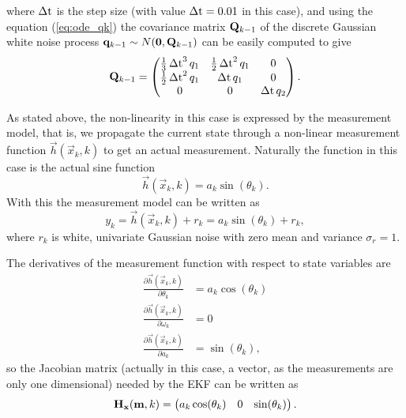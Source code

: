%
where $\operatorname{\Delta t}$ is the step size (with value $\operatorname{\Delta t} = 0.01$ in this case),
and using the equation (\ref{eq:ode_qk}) the covariance matrix
$\mathbf{Q}_{k-1}$ of the discrete Gaussian white noise process
$\mathbf{q}_{k-1} \sim N(\mathbf{0},\mathbf{Q}_{k-1})$ can be easily computed
to give
%
\begin{equation}
%
\mat{Q}_{k-1} = \begin{pmatrix} \frac{1}{3}\dt^3q_1 &
\frac{1}{2}\dt^2q_1 & 0\\ \frac{1}{2}\dt^2q_1 & \dt q_1 & 0\\ 0 & 0 &
\dt q_2
\end{pmatrix}.
\end{equation}
%

As stated above, the non-linearity in this case is expressed by the
measurement model, that is, we propagate the current state through a
non-linear measurement function $\vec{h}(\vec{x}_{k},k)$ to get an
actual measurement. Naturally the function in this case is the actual
sine function
%
\begin{equation}
%
\vec{h}(\vec{x}_{k},k) = a_k\sin(\theta_k). \label{eq:ekf_demo1_h}
%
\end{equation}
%
With this the measurement model can be written as
%
\begin{equation}
%
y_k = \vec{h}(\vec{x}_k,k) + r_k = a_k\sin(\theta_k) + r_k,
%
\end{equation}
%
where $r_k$ is white, univariate Gaussian noise with zero mean and
variance $\sigma_r = 1$.
 
The derivatives of the measurement function with respect to state
variables are
%
\begin{equation}
\begin{split}
%
\frac{\partial \vec{h}(\vec{x}_{k},k)}{\partial \theta_k} &=
a_k\cos(\theta_k)\\ \frac{\partial \vec{h}(\vec{x}_{k},k)}{\partial
\omega_k} &= 0\\ \frac{\partial \vec{h}(\vec{x}_{k},k)}{\partial a_k}
&= \sin(\theta_k),
%
\end{split}
\end{equation}
%
so the Jacobian matrix (actually in this case, a vector, as the
measurements are only one dimensional) needed by the EKF can be
written as
%
\begin{equation}
%
\mat{H}_{\vec{x}}(\vec{m},k) = \begin{pmatrix} a_k\cos(\theta_k) & 0 &
\sin(\theta_k) \label{eq:ekf_demo1_jacobian}
\end{pmatrix}.
%
\end{equation}
%

